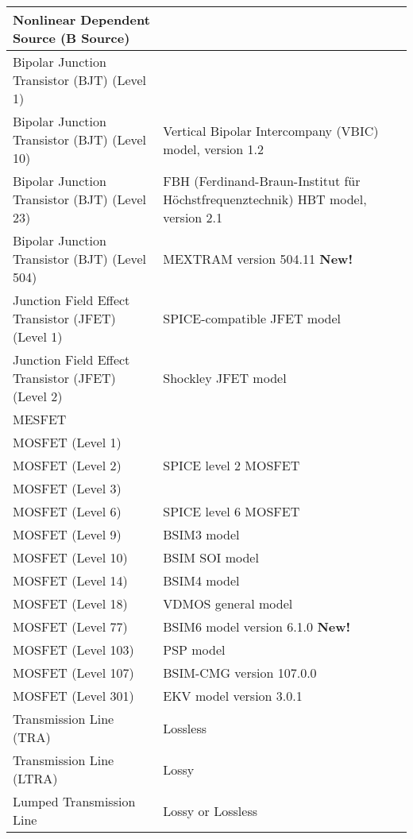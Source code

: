 \begin{longtable}[h] {>{\raggedright\small}m{2in}|>{\raggedright\let\\\tabularnewline\small}m{3.5in}}
    Nonlinear Dependent Source  (B Source) & \\ \hline

    Bipolar Junction Transistor (BJT) (Level 1)&  \\ \hline

    Bipolar Junction Transistor (BJT) (Level 10)& 
Vertical Bipolar Intercompany (VBIC) model, version 1.2 \\ \hline

    Bipolar Junction Transistor (BJT) (Level 23)& 
FBH (Ferdinand-Braun-Institut f\"ur H\"ochstfrequenztechnik) HBT model, version 2.1 \\ \hline

    Bipolar Junction Transistor (BJT) (Level 504)& 
MEXTRAM version 504.11 {\color{red}\textbf{New!}} \\ \hline

    Junction Field Effect Transistor (JFET) (Level 1)  &  
SPICE-compatible JFET model\\ \hline
    Junction Field Effect Transistor (JFET) (Level 2) &  
Shockley JFET model\\ \hline

    MESFET &  \\ \hline

    MOSFET (Level 1) &  \\ \hline
    MOSFET (Level 2) &  SPICE level 2 MOSFET \\ \hline
    MOSFET (Level 3) &  \\ \hline
    MOSFET (Level 6) &  SPICE level 6 MOSFET \\ \hline
    MOSFET (Level 9) &  BSIM3 model \\ \hline
    MOSFET (Level 10) & BSIM SOI model \\ \hline
    MOSFET (Level 14) & BSIM4 model \\ \hline
    MOSFET (Level 18) &  VDMOS general model \\ \hline
    MOSFET (Level 77) & BSIM6 model version 6.1.0 {\color{red}\textbf{New!}} \\ \hline
    MOSFET (Level 103) & PSP model \\ \hline
    MOSFET (Level 107)  & BSIM-CMG version 107.0.0 \\ \hline
    MOSFET (Level 301)& EKV model version 3.0.1 \\ \hline

    Transmission Line (TRA) &  Lossless \\ \hline
    Transmission Line (LTRA) &  Lossy  \\ \hline
    Lumped Transmission Line &  Lossy or Lossless \\ \hline


\end{longtable}
